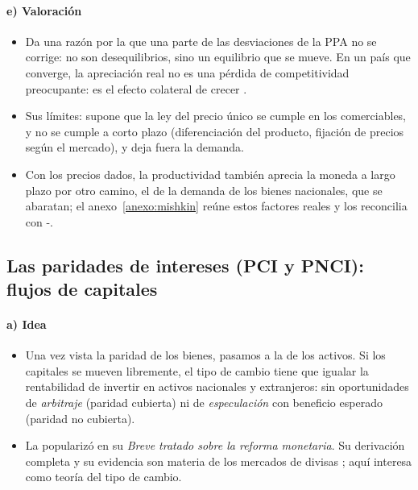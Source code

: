 \documentclass[11pt]{article}
\begin{document}
\paragraph{e) Valoración}
\begin{itemize}
\item Da una razón por la que una parte de las desviaciones de la PPA no se corrige: no son desequilibrios, sino un equilibrio que se mueve. En un país que converge, la apreciación real no es una pérdida de competitividad preocupante: es el efecto colateral de crecer .
\item Sus límites: supone que la ley del precio único se cumple en los comerciables, y no se cumple a corto plazo (diferenciación del producto, fijación de precios según el mercado), y deja fuera la demanda.
\item Con los precios dados, la productividad también aprecia la moneda a largo plazo por otro camino, el de la demanda de los bienes nacionales, que se abaratan; el anexo~\ref{anexo:mishkin} reúne estos factores reales y los reconcilia con -.
\end{itemize}

\subsection{Las paridades de intereses (PCI y PNCI): flujos de capitales}\label{sec:paridades}

\paragraph{a) Idea}
\begin{itemize}
\item Una vez vista la paridad de los bienes, pasamos a la de los activos. Si los capitales se mueven libremente, el tipo de cambio tiene que igualar la rentabilidad de invertir en activos nacionales y extranjeros: sin oportunidades de \emph{arbitraje} (paridad cubierta) ni de \emph{especulación} con beneficio esperado (paridad no cubierta).
\item La popularizó  en su \emph{Breve tratado sobre la reforma monetaria}\nocite{Keynes1923Tract}. Su derivación completa y su evidencia son materia de los mercados de divisas ; aquí interesa como teoría del tipo de cambio.
\end{itemize}
\end{document}
